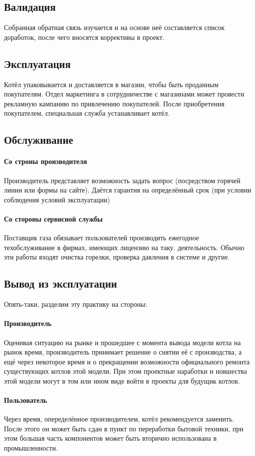 \documentclass[bibliography=totocnumbered]{scrartcl}
\begin{document}
\subsection{Валидация}
Собранная обратная связь изучается и на основе неё составляется список доработок, после чего вносятся коррективы в проект.

\subsection{Эксплуатация}
Котёл упаковывается и доставляется в магазин, чтобы быть проданным покупателям. Отдел маркетинга в сотрудничестве с магазинами может провести рекламную кампанию по привлечению покупателей. После приобретения покупателем, специальная служба устанавливает котёл. 

\subsection{Обслуживание}

\paragraph{Со строны производителя}
Производитель представляет возможность задать вопрос (посредством горячей линии или формы на сайте). Даётся гарантия на определённый срок (при условии соблюдения условий эксплуатации)

\paragraph{Со стороны сервисной службы}
Поставщик газа обязывает пользователей производить ежегодное техобслуживание в фирмах, имеющих лицензию на таку. деятельность. Обычно эти работы входят очистка горелки, проверка давления в системе и другие. 

\subsection{Вывод из эксплуатации}
Опять-таки, разделим эту практику на стороны:

\paragraph{Производитель}
Оценивая ситуацию на рынке и прошедшее с момента вывода модели котла на рынок время, производитель принимает решение о снятии её с производства, а ещё через некоторое время и о прекращении возможности официального ремонта существующих котлов этой модели. При этом проектные наработки и новшества этой модели могут в том или ином виде войти в проекты для будущик котлов.

\paragraph{Пользователь}
Через время, опеределённое производителем, котёл рекомендуется заменить. После этого он может быть сдан в пункт по переработки бытовой техники, при этом большая часть компонентов может быть вторично использована в промышленности.
\end{document}
